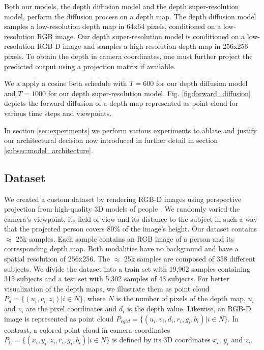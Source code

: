 Both our models, the depth diffusion model and the depth super-resolution model, perform the diffusion process on a depth map. The depth diffusion model samples a low-resolution depth map in 64x64 pixels, conditioned on a low-resolution RGB image. Our depth super-resolution model is conditioned on a low-resolution RGB-D image and samples a high-resolution depth map in 256x256 pixels. To obtain the depth in camera coordinates, one must further project the predicted output using a projection matrix if available.

We a apply a cosine beta schedule with $T=600$ for our depth diffusion model and $T=1000$ for our depth super-resolution model. Fig. \ref{fig:forward_diffusion} depicts the forward diffusion of a depth map represented as point cloud for various time steps and viewpoints.

In section \ref{sec:experiments} we perform various experiments to ablate and justify our architectural decision now introduced in further detail in section \ref{subsec:model_architecture}.

\subsection{Dataset}\label{subsec:dataset}

We created a custom dataset by rendering RGB-D images using perspective projection from high-quality 3D models of people \citep{volograms2021,escribano2022texture}. We randomly varied the camera's viewpoint, its field of view and its distance to the subject in such a way that the projected person covers 80\% of the image's height. Our dataset contains $\approx$ 25k samples. Each sample contains an RGB image of a person and its corresponding depth map. Both modalities have no background and have a spatial resolution of 256x256. 
The $\approx$ 25k samples are composed of 358 different subjects. We divide the dataset into a train set with 19,902 samples containing 315 subjects and a test set with 5,302 samples of 43 subjects. For better visualization of the depth maps, we illustrate them as point cloud $P_d = \{\left(u_{i}, v_{i},z_{i}\right) | i \in N \}$, where $N$ is the number of pixels of the depth map, $u_{i}$ and $v_{i}$ are the pixel coordinates and $d_{i}$ is the depth value. Likewise, an RGB-D image is represented as point cloud $P_{rgbd}= \{\left(u_{i}, v_{i}, d_{i},r_{i}, g_{i}, b_{i}\right) | i \in N \}$. In contrast, a colored point cloud in camera coordinates $P_{C}= \{\left(x_{i}, y_{i}, z_{i},r_{i}, g_{i}, b_{i}\right) | i \in N \}$ is defined by its 3D coordinates $x_i$, $y_i$ and $z_i$.

